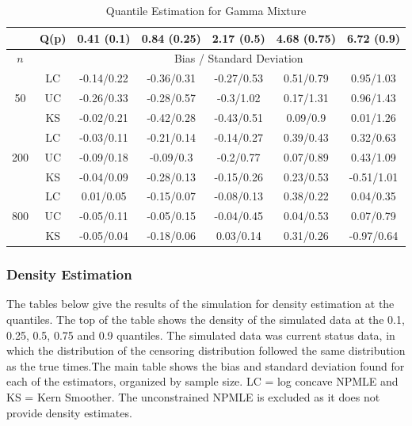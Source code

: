 \documentclass[12pt]{article}
\numberwithin{equation}{section}
\begin{document}
\begin{table}[H]

\begin{center}
\caption{Quantile Estimation for Gamma Mixture}

\begin{tabular} {| c | c | c | c | c | c | c | } 

	 \hline
		&Q(p)&	0.41 (0.1)&	0.84 (0.25)&	2.17 (0.5)&	4.68 (0.75)&	6.72 (0.9)\\ 
 \hline 
 	$n$ & & \multicolumn{5}{|c|}{Bias / Standard Deviation} 
 \\ 
 \hline 
\multirow{3}{*}{50}		&	LC	&-0.14/0.22	&-0.36/0.31	&-0.27/0.53	&0.51/0.79	&0.95/1.03\\ 
			&	UC	&-0.26/0.33	&-0.28/0.57	&-0.3/1.02	&0.17/1.31	&0.96/1.43\\ 
			&	KS	&-0.02/0.21	&-0.42/0.28	&-0.43/0.51	&0.09/0.9	&0.01/1.26\\ 
	\hline 
\multirow{3}{*}{200}		&	LC	&-0.03/0.11	&-0.21/0.14	&-0.14/0.27	&0.39/0.43	&0.32/0.63\\ 
			&	UC	&-0.09/0.18	&-0.09/0.3	&-0.2/0.77	&0.07/0.89	&0.43/1.09\\ 
			&	KS	&-0.04/0.09	&-0.28/0.13	&-0.15/0.26	&0.23/0.53	&-0.51/1.01\\ 
	\hline 
\multirow{3}{*}{800}		&	LC	&0.01/0.05	&-0.15/0.07	&-0.08/0.13	&0.38/0.22	&0.04/0.35\\ 
			&	UC	&-0.05/0.11	&-0.05/0.15	&-0.04/0.45	&0.04/0.53	&0.07/0.79\\ 
			&	KS	&-0.05/0.04	&-0.18/0.06	&0.03/0.14	&0.31/0.26	&-0.97/0.64\\ 
	\hline 

\end{tabular}
\end{center}
\end{table}
	
	
	{\subsubsection{Density Estimation} } 
	
	The tables below give the results of the simulation for density estimation at the quantiles. The top of the table shows the density of the simulated data at the  0.1, 0.25, 0.5, 0.75 and 0.9 quantiles. The simulated data was current status data, in which the distribution of the censoring distribution followed the same distribution as the true times.The main table shows the bias and standard deviation found for each of the estimators, organized by sample size. LC = log concave NPMLE and KS = Kern Smoother. The unconstrained NPMLE is excluded as it does not provide density estimates. 
\end{document}
